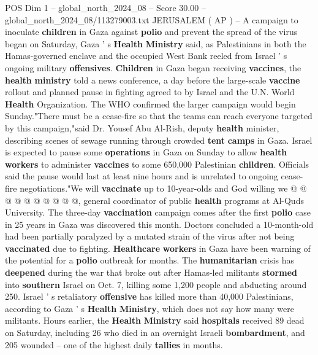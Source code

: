 \begin{textsample}{POS Dim 1 – global\_north\_2024\_08 – Score 30.00 – global\_north\_2024\_08/113279003.txt}  \label{ex:f1_pos_407}
JERUSALEM ( AP ) -- A campaign to inoculate \textbf{children} in Gaza against \textbf{polio} and prevent the spread of the virus began on Saturday, Gaza ' s \textbf{Health} \textbf{Ministry} said, as Palestinians in both the Hamas-governed enclave and the occupied West Bank reeled from Israel ' s ongoing military \textbf{offensives}. \textbf{Children} in Gaza began receiving \textbf{vaccines}, the \textbf{health} \textbf{ministry} told a news conference, a day before the large-scale \textbf{vaccine} rollout and planned pause in fighting agreed to by Israel and the U.N.
World \textbf{Health} Organization.
The WHO confirmed the larger campaign would begin Sunday."There must be a cease-fire so that the teams can reach everyone targeted by this campaign,"said Dr.
Yousef Abu Al-Rish, deputy \textbf{health} minister, describing scenes of sewage running through crowded \textbf{tent} \textbf{camps} in Gaza.
Israel is expected to pause some \textbf{operations} in Gaza on Sunday to allow \textbf{health} \textbf{workers} to administer \textbf{vaccines} to some 650,000 Palestinian \textbf{children}.
Officials said the pause would last at least nine hours and is unrelated to ongoing cease-fire negotiations."We will \textbf{vaccinate} up to 10-year-olds and God willing we @ @ @ @ @ @ @ @ @ @, general coordinator of public \textbf{health} programs at Al-Quds University.
The three-day \textbf{vaccination} campaign comes after the first \textbf{polio} case in 25 years in Gaza was discovered this month.
Doctors concluded a 10-month-old had been partially paralyzed by a mutated strain of the virus after not being \textbf{vaccinated} due to fighting. \textbf{Healthcare} \textbf{workers} in Gaza have been warning of the potential for a \textbf{polio} outbreak for months.
The \textbf{humanitarian} crisis has \textbf{deepened} during the war that broke out after Hamas-led militants \textbf{stormed} into \textbf{southern} Israel on Oct. 7, killing some 1,200 people and abducting around 250.
Israel ' s retaliatory \textbf{offensive} has killed more than 40,000 Palestinians, according to Gaza ' s \textbf{Health} \textbf{Ministry}, which does not say how many were militants.
Hours earlier, the \textbf{Health} \textbf{Ministry} said \textbf{hospitals} received 89 dead on Saturday, including 26 who died in an overnight Israeli \textbf{bombardment}, and 205 wounded -- one of the highest daily \textbf{tallies} in months.

\end{textsample}

